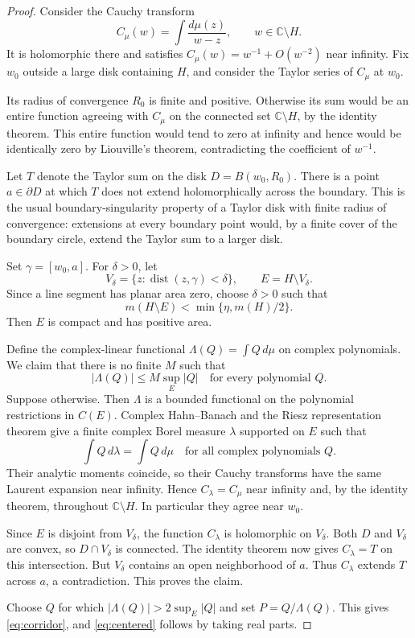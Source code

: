\documentclass[11pt]{article}
\newcommand{\C}{\mathbb C}
\DeclareMathOperator{\dist}{dist}
\theoremstyle{remark}
\numberwithin{equation}{section}
\begin{document}
\begin{proof}
Consider the Cauchy transform
\[
 C_\mu(w)=\int\frac{d\mu(z)}{w-z},\qquad w\in\C\setminus H.
\]
It is holomorphic there and satisfies
$C_\mu(w)=w^{-1}+O(w^{-2})$ near infinity. Fix $w_0$ outside a
large disk containing $H$, and consider the Taylor series of $C_\mu$
at $w_0$.

Its radius of convergence $R_0$ is finite and positive. Otherwise its
sum would be an entire function agreeing with $C_\mu$ on the connected
set $\C\setminus H$, by the identity theorem. This entire function
would tend to zero at infinity and hence would be identically zero by
Liouville's theorem, contradicting the coefficient of $w^{-1}$.

Let $T$ denote the Taylor sum on the disk
$D=B(w_0,R_0)$. There is a point $a\in\partial D$ at which $T$
does not extend holomorphically across the boundary. This is the usual
boundary-singularity property of a Taylor disk with finite radius of
convergence: extensions at every boundary point would, by a finite
cover of the boundary circle, extend the Taylor sum to a larger disk.

Set $\gamma=[w_0,a]$. For $\delta>0$, let
\[
 V_\delta=\{z:\dist(z,\gamma)<\delta\},\qquad
 E=H\setminus V_\delta.
\]
Since a line segment has planar area zero, choose $\delta>0$ such that
\[
 m(H\setminus E)<\min\{\eta,m(H)/2\}.
\]
Then $E$ is compact and has positive area.

Define the complex-linear functional
$\Lambda(Q)=\int Q\,d\mu$ on complex polynomials. We claim that
there is no finite $M$ such that
\begin{equation}\label{eq:bounded-functional}
 |\Lambda(Q)|\le M\sup_E|Q|\quad\text{for every polynomial }Q.
\end{equation}
Suppose otherwise. Then $\Lambda$ is a bounded functional on the
polynomial restrictions in $C(E)$. Complex Hahn--Banach and the Riesz
representation theorem give a finite complex Borel measure $\lambda$
supported on $E$ such that
\[
 \int Q\,d\lambda=\int Q\,d\mu
 \quad\text{for all complex polynomials }Q.
\]
Their analytic moments coincide, so their Cauchy transforms have the
same Laurent expansion near infinity. Hence $C_\lambda=C_\mu$
near infinity and, by the identity theorem, throughout $\C\setminus H$.
In particular they agree near $w_0$.

Since $E$ is disjoint from $V_\delta$, the function $C_\lambda$
is holomorphic on $V_\delta$. Both $D$ and $V_\delta$ are convex,
so $D\cap V_\delta$ is connected. The identity theorem now gives
$C_\lambda=T$ on this intersection. But $V_\delta$ contains an open
neighborhood of $a$. Thus $C_\lambda$ extends $T$ across $a$, a
contradiction. This proves the claim.

Choose $Q$ for which $|\Lambda(Q)|>2\sup_E|Q|$ and set
$P=Q/\Lambda(Q)$. This gives \eqref{eq:corridor}, and
\eqref{eq:centered} follows by taking real parts.
\end{proof}
\end{document}
